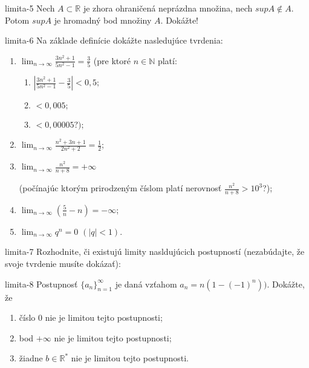 \begin{defproblem}{limita-5}
Nech $A \subset \mathbb{R}$ je zhora ohraničená neprázdna množina, nech $sup A \notin A$. Potom $sup A$ je hromadný bod množiny $A$. Dokážte!
\end{defproblem}

\begin{defproblem}{limita-6}
 Na základe definície dokážte nasledujúce tvrdenia:
 \begin{enumerate}
 \item $\lim_{n \rightarrow \infty} \frac{3n^2+1}{5n^2-1}=\frac{3}{5}$ (pre ktoré $n \in \mathbb{N}$ platí:
 \begin{enumerate}
 \item $|\frac{3n^2+1}{5n^2-1}-\frac{3}{5}|<0,5;$
 \item $<0,005;$
 \item $<0,00005 ?);$
 \end{enumerate}

 \item $\lim_{n \rightarrow \infty} \frac{n^2+3n+1}{2n^2+2}=\frac{1}{2}$;
 \item $\lim_{n \rightarrow \infty} \frac{n^2}{n+8}=+\infty$

 (počínajúc ktorým prirodzeným číslom platí nerovnosť $\frac{n^2}{n+8}>10^3$?);
 \item $\lim_{n \rightarrow \infty} (\frac{5}{n}-n)=-\infty$;
 \item $\lim_{n \rightarrow \infty} q^n=0$  $(|q|<1).$
 \end{enumerate}
\end{defproblem}

\begin{defproblem}{limita-7}
Rozhodnite, či existujú limity nasldujúcich postupností (nezabúdajte, že svoje
tvrdenie musíte dokázať):
\end{defproblem}

\begin{defproblem}{limita-8}
Postupnosť ${\{a_n\}}_{n=1}^\infty$ je daná vzťahom $a_n=n(1-(-1)^n)).$ Dokážte, že
\begin{enumerate}
\item číslo $0$ nie je limitou tejto postupnosti;
\item bod $+\infty$ nie je limitou tejto postupnosti;
\item žiadne $b \in \mathbb{R^*}$ nie je limitou tejto postupnosti.
\end{enumerate}
\end{defproblem}

